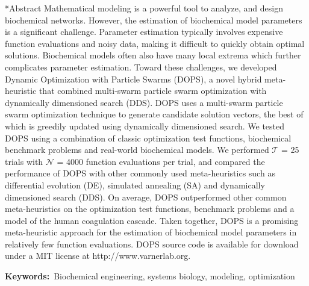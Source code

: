 \documentclass[12pt]{article}
\makeatletter
\renewcommand\section{\@startsection
	{subsection}{2}{0mm}
	{-0.2in}
	{0.05\baselineskip}
	{\normalfont\large\bfseries}}
\makeatother
\begin{document}
\section*{Abstract}
Mathematical modeling is a powerful tool to analyze, and design biochemical networks.
However, the estimation of biochemical model parameters is a significant challenge.
Parameter estimation typically involves expensive function evaluations and noisy data, making it difficult to quickly obtain optimal solutions.
Biochemical models often also have many local extrema which further complicates parameter estimation.
Toward these challenges, we developed Dynamic Optimization with Particle Swarms (DOPS), a novel hybrid meta-heuristic that combined multi-swarm particle swarm optimization with dynamically dimensioned search (DDS).
DOPS uses a multi-swarm particle swarm optimization technique to generate candidate solution vectors, the best of which is greedily updated using dynamically dimensioned search.
We tested DOPS using a combination of classic optimization test functions, biochemical benchmark problems and real-world biochemical models.
We performed $\mathcal{T}$ = 25 trials with $\mathcal{N}$ = 4000 function evaluations per trial, and compared the performance of DOPS with other commonly
used meta-heuristics such as differential evolution (DE), simulated annealing (SA) and dynamically dimensioned search (DDS).
On average, DOPS outperformed other common meta-heuristics on the optimization test functions,
benchmark problems and a model of the human coagulation cascade.
Taken together, DOPS is a promising meta-heuristic approach for the estimation of biochemical model parameters in relatively few function evaluations.
DOPS source code is available for download under a MIT license at http://www.varnerlab.org.



\vspace{0.1in}
{\noindent \textbf{Keywords:}~Biochemical engineering, systems biology, modeling, optimization}

\end{document}
